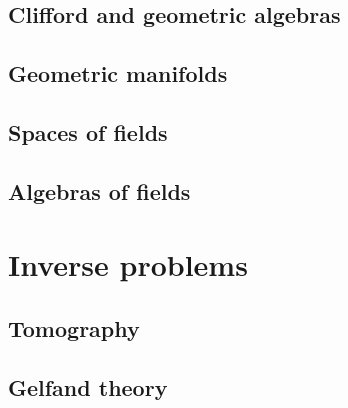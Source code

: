\documentclass[doctor]{thesis}
\begin{document}
\section{Clifford and geometric algebras}
\label{subsec:clifford_and_geometric_algebras}


\section{Geometric manifolds}
\label{sec:geometric_manifolds}


\section{Spaces of fields}
\label{sec:spaces_of_fields}


\section{Algebras of fields}
\label{sec:algebras_of_fields}



\newpage



\chapter{Inverse problems}

\section{Tomography}
\label{sec:calderon_problem}


\section{Gelfand theory}
\label{sec:gelfand_theory}

\end{document}
